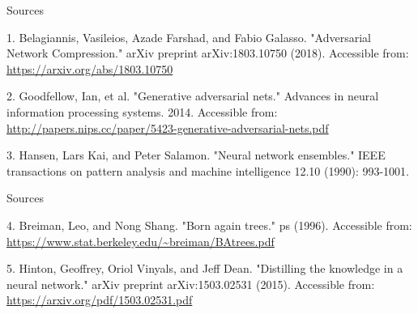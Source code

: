 \documentclass{beamer}
\begin{document}
\begin{frame}{Sources}

\begin{thebibliography}{0}

   1. Belagiannis, Vasileios, Azade Farshad, and Fabio Galasso. "Adversarial Network Compression." arXiv preprint arXiv:1803.10750 (2018). Accessible from: \url{https://arxiv.org/abs/1803.10750}
  
   2. Goodfellow, Ian, et al. "Generative adversarial nets." Advances in neural information processing systems. 2014. Accessible from: \url{http://papers.nips.cc/paper/5423-generative-adversarial-nets.pdf}
  
   3. Hansen, Lars Kai, and Peter Salamon. "Neural network ensembles." IEEE transactions on pattern analysis and machine intelligence 12.10 (1990): 993-1001.
\end{thebibliography}

\end{frame}


\begin{frame}{Sources}

\begin{thebibliography}{0}
   4. Breiman, Leo, and Nong Shang. "Born again trees." ps (1996). Accessible from: \url{https://www.stat.berkeley.edu/~breiman/BAtrees.pdf}
  
   5. Hinton, Geoffrey, Oriol Vinyals, and Jeff Dean. "Distilling the knowledge in a neural network." arXiv preprint arXiv:1503.02531 (2015). Accessible from: \url{https://arxiv.org/pdf/1503.02531.pdf}
  

\end{thebibliography}

\end{frame}
 
 
 
\end{document}
